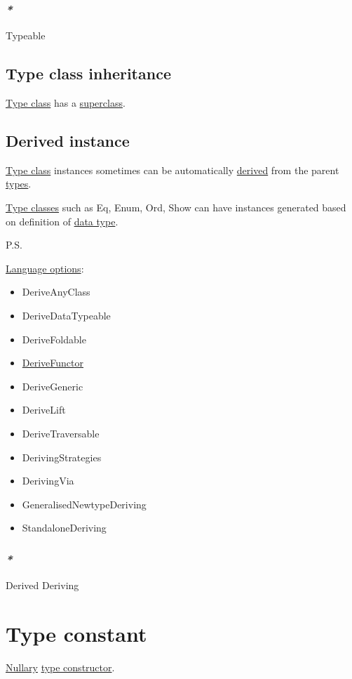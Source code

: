 \documentclass[a4paper,14pt,oneside]{book}
\begin{document}
\subsubsection{\emph{*}}
\label{sec:org3f48217}

\label{orgb1534d9}Typeable

\subsection{\label{org7420066}Type class inheritance}
\label{sec:org66f2e5f}
\hyperref[org8cb2c3b]{Type class} has a \hyperref[orgae58e92]{superclass}.

\subsection{\label{org83f9fcc}Derived instance}
\label{sec:orga0312d1}
\hyperref[org8cb2c3b]{Type class} instances sometimes can be automatically \hyperref[orgd9d25d0]{derived} from the parent \hyperref[orge9a3a14]{types}.

\hyperref[org59800da]{Type classes} such as Eq, Enum, Ord, Show can have instances generated based on definition of \hyperref[org194580e]{data type}.

P.S.

\hyperref[orga169828]{Language options}:
\begin{itemize}
\item DeriveAnyClass
\item DeriveDataTypeable
\item DeriveFoldable
\item \hyperref[orgd2413f7]{DeriveFunctor}
\item DeriveGeneric
\item DeriveLift
\item DeriveTraversable
\item DerivingStrategies
\item DerivingVia
\item GeneralisedNewtypeDeriving
\item StandaloneDeriving
\end{itemize}

\subsubsection{\emph{*}}
\label{sec:orgfc703c2}

\label{orgd9d25d0}Derived
\label{orgf5d2b90}Deriving

\section{\label{orgfed6c7b}Type constant}
\label{sec:orga048298}
\hyperref[org0155815]{Nullary} \hyperref[org7b71390]{type constructor}.
\end{document}
